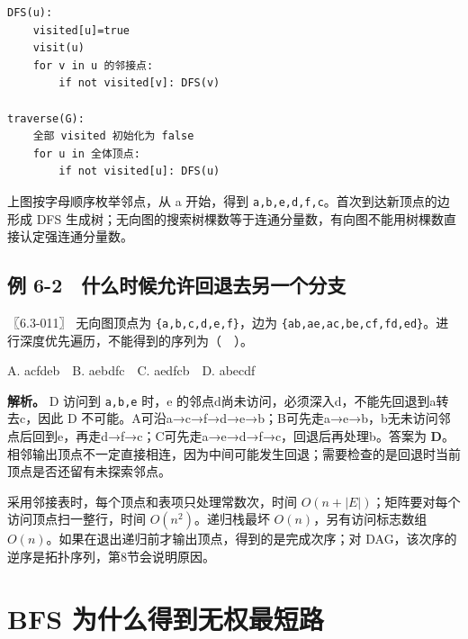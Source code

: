 \par\medskip\noindent
\begin{minipage}{\linewidth}
\begin{verbatim}
DFS(u):
    visited[u]=true
    visit(u)
    for v in u 的邻接点:
        if not visited[v]: DFS(v)

traverse(G):
    全部 visited 初始化为 false
    for u in 全体顶点:
        if not visited[u]: DFS(u)
\end{verbatim}
\end{minipage}\par\medskip

上图按字母顺序枚举邻点，从 a 开始，得到 \texttt{a,}\allowbreak{}\texttt{b,}\allowbreak{}\texttt{e,}\allowbreak{}\texttt{d,}\allowbreak{}\texttt{f,}\allowbreak{}\texttt{c}。首次到达新顶点的边形成 DFS 生成树；无向图的搜索树棵数等于连通分量数，有向图不能用树棵数直接认定强连通分量数。

\subsection{例 6-2　什么时候允许回退去另一个分支}\label{ds-ex6-2}

\noindent{}〖6.3-011〗 无向图顶点为 \texttt{\{a,}\allowbreak{}\texttt{b,}\allowbreak{}\texttt{c,}\allowbreak{}\texttt{d,}\allowbreak{}\texttt{e,}\allowbreak{}\texttt{f\}}，边为 \texttt{\{ab,}\allowbreak{}\texttt{ae,}\allowbreak{}\texttt{ac,}\allowbreak{}\texttt{be,}\allowbreak{}\texttt{cf,}\allowbreak{}\texttt{fd,}\allowbreak{}\texttt{ed\}}。进行深度优先遍历，不能得到的序列为（　）。

A. acfdeb　B. aebdfc　C. aedfcb　D. abecdf


\textbf{解析。} D 访问到 \texttt{a,}\allowbreak{}\texttt{b,}\allowbreak{}\texttt{e} 时，e 的邻点d尚未访问，必须深入d，不能先回退到a转去c，因此 D 不可能。A可沿a→c→f→d→e→b；B可先走a→e→b，b无未访问邻点后回到e，再走d→f→c；C可先走a→e→d→f→c，回退后再处理b。答案为 \textbf{D}。相邻输出顶点不一定直接相连，因为中间可能发生回退；需要检查的是回退时当前顶点是否还留有未探索邻点。

采用邻接表时，每个顶点和表项只处理常数次，时间 \(O(n+|E|)\)；矩阵要对每个访问顶点扫一整行，时间 \(O(n^2)\)。递归栈最坏 \(O(n)\)，另有访问标志数组 \(O(n)\)。如果在退出递归前才输出顶点，得到的是完成次序；对 DAG，该次序的逆序是拓扑序列，第8节会说明原因。

\section{BFS 为什么得到无权最短路}\label{ds-06-05}

